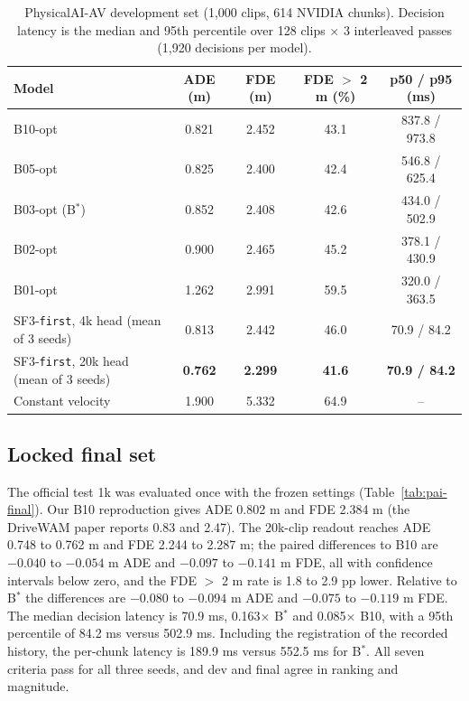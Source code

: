 \documentclass[10pt]{article}
\newcommand{\Bstar}{B$^{*}$}
\newcommand{\first}{\texttt{first}}
\begin{document}
\begin{table}[t]
\caption{PhysicalAI-AV development set (1,000 clips, 614 NVIDIA chunks). Decision latency is the median and 95th percentile over 128 clips $\times$ 3 interleaved passes (1,920 decisions per model).}
\label{tab:pai-dev}
\begin{center}
\small
\begin{tabular}{lcccc}
\toprule
Model & ADE (m) & FDE (m) & FDE $>$ 2 m (\%) & p50 / p95 (ms) \\
\midrule
B10-opt & 0.821 & 2.452 & 43.1 & 837.8 / 973.8 \\
B05-opt & 0.825 & 2.400 & 42.4 & 546.8 / 625.4 \\
B03-opt (\Bstar{}) & 0.852 & 2.408 & 42.6 & 434.0 / 502.9 \\
B02-opt & 0.900 & 2.465 & 45.2 & 378.1 / 430.9 \\
B01-opt & 1.262 & 2.991 & 59.5 & 320.0 / 363.5 \\
SF3-\first{}, 4k head (mean of 3 seeds) & 0.813 & 2.442 & 46.0 & 70.9 / 84.2 \\
SF3-\first{}, 20k head (mean of 3 seeds) & \textbf{0.762} & \textbf{2.299} & \textbf{41.6} & \textbf{70.9 / 84.2} \\
Constant velocity & 1.900 & 5.332 & 64.9 & -- \\
\bottomrule
\end{tabular}
\end{center}
\end{table}

\subsection{Locked final set}
\label{sec:pai-final}

The official test 1k was evaluated once with the frozen settings (Table~\ref{tab:pai-final}). Our B10 reproduction gives ADE 0.802 m and FDE 2.384 m (the DriveWAM paper reports 0.83 and 2.47). The 20k-clip readout reaches ADE 0.748 to 0.762 m and FDE 2.244 to 2.287 m; the paired differences to B10 are $-0.040$ to $-0.054$ m ADE and $-0.097$ to $-0.141$ m FDE, all with confidence intervals below zero, and the FDE $>$ 2 m rate is 1.8 to 2.9 pp lower. Relative to \Bstar{} the differences are $-0.080$ to $-0.094$ m ADE and $-0.075$ to $-0.119$ m FDE. The median decision latency is 70.9 ms, 0.163$\times$ \Bstar{} and 0.085$\times$ B10, with a 95th percentile of 84.2 ms versus 502.9 ms. Including the registration of the recorded history, the per-chunk latency is 189.9 ms versus 552.5 ms for \Bstar{}. All seven criteria pass for all three seeds, and dev and final agree in ranking and magnitude.
\end{document}
